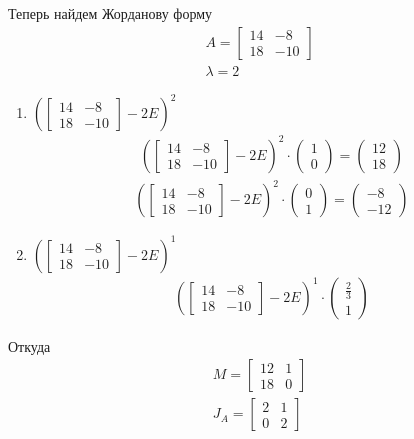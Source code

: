 \vskip 0.3in
Теперь найдем Жорданову форму
\begin{gather*}
	A = 
	\begin{bmatrix}
	14 & -8 \\ 18 & -10
	\end{bmatrix}\\
	\lambda = 2
\end{gather*}
\begin{enumerate}
\item 
	$\left(\begin{bmatrix}
	14 & -8\\ 18 & -10
	\end{bmatrix} - 2E\right)^2$ 
	\begin{gather*}
		\left(\begin{bmatrix}
			14 & -8\\ 18 & -10
		\end{bmatrix} - 2E\right)^2
		\cdot
		\begin{pmatrix}
			1 \\ 0
		\end{pmatrix}
		=
		\begin{pmatrix}
			12 \\ 18
		\end{pmatrix}
	\end{gather*}
	\vskip 0.1in
	\begin{gather*}
		\left(\begin{bmatrix}
			14 & -8\\ 18 & -10
		\end{bmatrix} - 2E\right)^2
		\cdot
		\begin{pmatrix}
			0 \\ 1
		\end{pmatrix}
		=
		\begin{pmatrix}
			-8 \\ -12
		\end{pmatrix}
	\end{gather*}

\item 
	$\left(\begin{bmatrix}
	14 & -8\\ 18 & -10
	\end{bmatrix} - 2E\right)^1$
	\begin{gather*}
		\left(\begin{bmatrix}
		14 & -8\\ 18 & -10
		\end{bmatrix} - 2E\right)^1
		\cdot
		\begin{pmatrix}
			\frac{2}{3} \\ 1
		\end{pmatrix}
	\end{gather*}
\end{enumerate}
Откуда 
\begin{gather*}
	M = 
	\begin{bmatrix}
		12 & 1 \\ 18 & 0
	\end{bmatrix}\\
	J_A = 
	\begin{bmatrix}
		2 & 1 \\ 0 & 2
	\end{bmatrix}
\end{gather*}


